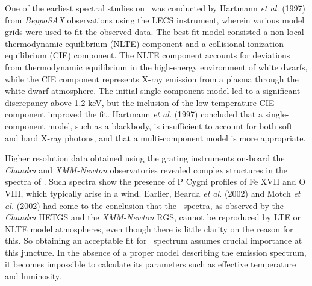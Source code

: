 	One of the earliest spectral studies on \source\ was conducted by Hartmann \textit{et al.} (1997) \cite{hartmann1999constraining} from \textit{BeppoSAX} observations using the LECS instrument, wherein various model grids were used to fit the observed data. The best-fit model consisted a non-local thermodynamic equilibrium (NLTE) component and a collisional ionization equilibrium (CIE) component. The NLTE component accounts for deviations from thermodynamic equilibrium in the high-energy environment of white dwarfs, while the CIE component represents X-ray emission from a plasma through the white dwarf atmosphere. %
	The initial single-component model led to a significant discrepancy above 1.2 keV, but the inclusion of the low-temperature CIE component improved the fit. Hartmann \textit{et al.} (1997) \cite{hartmann1999constraining} concluded that a single-component model, such as a blackbody, is insufficient to account for both soft and hard X-ray photons, and that a multi-component model is more appropriate.
	
	Higher resolution data obtained using the grating instruments on-board the \textit{Chandra} and \textit{XMM-Newton} observatories revealed complex structures in the spectra of \source. Such spectra show the presence of P Cygni profiles of Fe XVII and O VIII, which typically arise in a wind. Earlier, Bearda \textit{et al.} (2002) \cite{beardaChandra2002AA} and Motch \textit{et al.} (2002) \cite{motchXmmNewton2002AA} had come to the conclusion that the \source\ spectra, as observed by the \textit{Chandra} HETGS and the \textit{XMM-Newton} RGS, cannot be reproduced by LTE or NLTE model atmospheres, even though there is little clarity on the reason for this. So obtaining an acceptable fit for \source\ spectrum assumes crucial importance at this juncture. In the absence of a proper model describing the emission spectrum, it becomes impossible to calculate its parameters such as effective temperature and luminosity.
	
